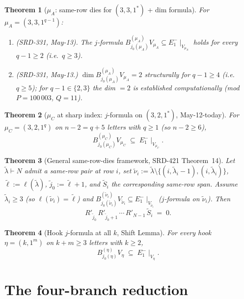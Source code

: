\documentclass[11pt]{article}
\newtheorem{theorem}{Theorem}
\theoremstyle{definition}
\begin{document}
\begin{theorem}[$\mu_A$: same-row dies for $(3, 3, 1^*)$ + dim formula]\label{thm:muA}
For $\mu_A = (3, 3, 1^{q-1})$:
\begin{enumerate}[leftmargin=2em,topsep=0.2em,itemsep=0.1em]
\item \emph{(SRD-331, May-13).} The $j$-formula
$B^{(\mu_A)}_{j_0(\mu_A)} V_{\mu_A} \subseteq E_1^-\!\mid_{V_{\mu_A}}$
holds for every $q - 1 \ge 2$ (i.e.\ $q \ge 3$).
\item \emph{(SRD-331, May-13.)} $\dim B^{(\mu_A)}_{j_0(\mu_A)} V_{\mu_A} = 2$
structurally for $q - 1 \ge 4$ (i.e.\ $q \ge 5$); for
$q - 1 \in \{2, 3\}$ the dim $= 2$ is established computationally
(mod $P = 100\,003$, $Q = 11$).
\end{enumerate}
\end{theorem}

\begin{theorem}[$\mu_C$ at sharp index: $j$-formula on $(3, 2, 1^*)$, May-12-today]\label{thm:muC}
For $\mu_C = (3, 2, 1^q)$ on $n - 2 = q + 5$ letters with $q \ge 1$
(so $n - 2 \ge 6$),
\[
   B^{(\mu_C)}_{j_0(\mu_C)} V_{\mu_C} \;\subseteq\; E_1^-\!\mid_{V_{\mu_C}}.
\]
\end{theorem}

\begin{theorem}[General same-row-dies framework, SRD-421 Theorem~14]\label{thm:srd-framework}
Let $\widetilde\lambda \vdash N$ admit a same-row pair at row $i$, set
$\widetilde\nu_i := \widetilde\lambda \setminus \{(i, \widetilde\lambda_i - 1),
(i, \widetilde\lambda_i)\}$, $\widetilde\ell := \ell(\widetilde\lambda)$,
$\widetilde j_0 := \widetilde\ell + 1$, and $\widetilde S_i$ the
corresponding same-row span. Assume $\widetilde\lambda_i \ge 3$
(so $\ell(\widetilde\nu_i) = \widetilde\ell$) and
$B^{(\widetilde\nu_i)}_{j_0(\widetilde\nu_i)} V_{\widetilde\nu_i}
\subseteq E_1^-\!\mid_{V_{\widetilde\nu_i}}$ ($j$-formula on
$\widetilde\nu_i$). Then
\[
   R'_{\widetilde j_0}\, R'_{\widetilde j_0 + 1}\, \cdots\, R'_{N-1}
   \, \widetilde S_i \;=\; 0.
\]
\end{theorem}

\begin{theorem}[Hook $j$-formula at all $k$, Shift Lemma]\label{thm:hook-j}
For every hook $\eta = (k, 1^m)$ on $k + m \ge 3$ letters with
$k \ge 2$,
\[
   B^{(\eta)}_{j_0(\eta)} V_\eta \;\subseteq\; E_1^-\!\mid_{V_\eta}.
\]
\end{theorem}

\section{The four-branch reduction}\label{sec:reduction}
\end{document}
